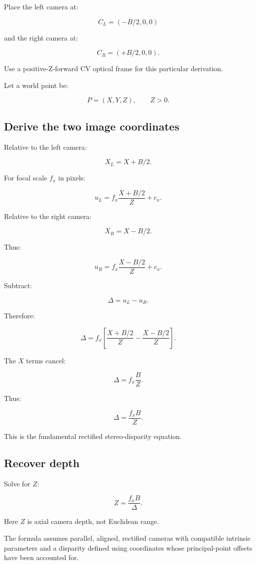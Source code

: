 Place the left camera at:

\[ C_L=(-B/2,0,0) \]

and the right camera at:

\[ C_R=(+B/2,0,0). \]

Use a positive-Z-forward CV optical frame for this particular derivation.

Let a world point be:

\[ P=(X,Y,Z),\qquad Z>0. \]

\subsection{Derive the two image coordinates}\label{02-foundations-ii-ch035-derive-the-two-image-coordinates}

Relative to the left camera:

\[ X_L=X+B/2. \]

For focal scale \(f_x\) in pixels:

\[ \boxed{ u_L=f_x\frac{X+B/2}{Z}+c_x. } \]

Relative to the right camera:

\[ X_R=X-B/2. \]

Thus:

\[ \boxed{ u_R=f_x\frac{X-B/2}{Z}+c_x. } \]

Subtract:

\[ \Delta=u_L-u_R. \]

Therefore:

\[ \Delta = f_x \left[ \frac{X+B/2}{Z} - \frac{X-B/2}{Z} \right]. \]

The \(X\) terms cancel:

\[ \Delta=f_x\frac BZ. \]

Thus:

\[ \boxed{ \Delta=\frac{f_xB}{Z}. } \]

This is the fundamental rectified stereo-disparity equation.

\subsection{Recover depth}\label{02-foundations-ii-ch035-recover-depth}

Solve for \(Z\):

\[ \boxed{ Z=\frac{f_xB}{\Delta}. } \]

Here \(Z\) is axial camera depth, not Euclidean range.

The formula assumes parallel, aligned, rectified cameras with compatible intrinsic parameters and a disparity defined using coordinates whose principal-point offsets have been accounted for.

